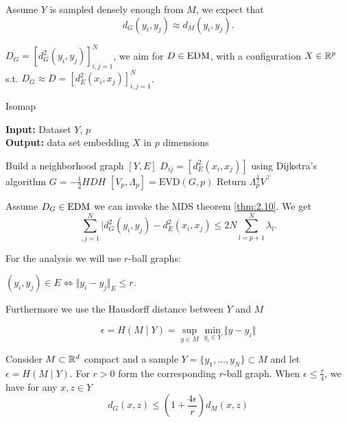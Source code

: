 Assume $Y$ is sampled densely enough from $M$, we expect that \[d_G(y_i,y_j)\approx d_M(y_i,y_j).\]

$D_G=[d_G^2(y_i,y_j)]_{i,j=1}^N$, we aim for $D\in\text{EDM}$, with a configuration $X\in\mathbb{R}^p$ s.t. 
$D_G\approx D=[d_E^2(x_i,x_j)]_{i,j=1}^N$.

\begin{algorithm}[H] %
    \caption{Isomap}\label{alg:isomap}
 \textbf{Input:} Dataset  $Y$, $p$\\
 \textbf{Output:} data set embedding $X$ in $p$ dimensions
 \begin{algorithmic}
    \State Build a neighborhood graph $[Y,E]$
    \State $D_{ij}=[d_E^2(x_i,x_j)]$ using Dijkstra's algorithm 
    \State $G=-\frac{1}{2} H D H$
    \State $[V_p,\Lambda_p]=\text{EVD}(G,p)$
    \State Return $\Lambda_p^{\frac{1}{2}} V^\intercal$
 \end{algorithmic}
\end{algorithm}

Assume $D_G\in\text{EDM}$ we can invoke the MDS theorem \ref{thm:2.10}. We get 
\[\sum_{,j=1}^N \vert d_G^2(y_i,y_j)-d_E^2(x_i,x_j)\leq 2 N \sum_{l=p+1}^N \lambda_l.\] 

For the analysis we will use $r$-ball graphs: 

$(y_i,y_j)\in E\iff \Vert y_i-y_j\Vert_E\leq r$.

Furthermore we use the Hausdorff distance between $Y$ and $M$

\[\epsilon=H(M\mid Y)=\sup_{y\in M}\min_{y_i\in Y}\Vert y-y_i\Vert\]

\begin{theorem}\label{thm:2.12}
    Consider $M\subset\mathbb{R}^d$ compact and a sample $Y=\{y_1,\dots,y_N\}\subset M$ and let 
    $\epsilon=H(M\mid Y)$. For $r>0$ form the corresponding $r$-ball graph. When $\epsilon\leq \frac{r}{4}$, we 
    have for any $x,z\in Y$
    \[d_G(x,z)\leq \left(1+\frac{4\epsilon}{r}\right)d_M(x,z)\] 
\end{theorem}